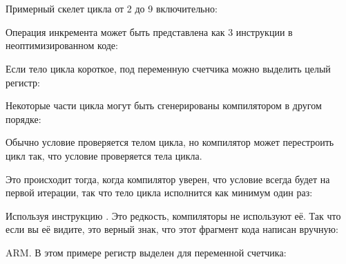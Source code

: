 ﻿\section{\Conclusion{}}

Примерный скелет цикла от 2 до 9 включительно:



Операция инкремента может быть представлена как 3 инструкции в неоптимизированном коде:



Если тело цикла короткое, под переменную счетчика можно выделить целый регистр:



Некоторые части цикла могут быть сгенерированы компилятором в другом порядке:



Обычно условие проверяется  телом цикла, но компилятор может перестроить цикл так, 
что условие проверяется  тела цикла.

Это происходит тогда, когда компилятор уверен, что условие всегда будет  на первой итерации,
так что тело цикла исполнится как минимум один раз:



Используя инструкцию . Это редкость, компиляторы не используют её.
Так что если вы её видите, это верный знак, что этот фрагмент кода написан вручную:



\ifdefined\IncludeARM
ARM. 
В этом примере регистр  выделен для переменной счетчика:



\fi

